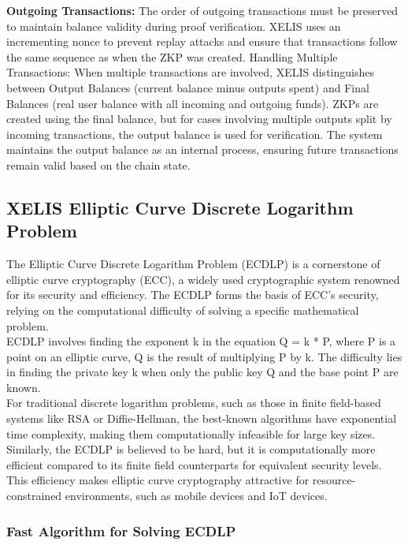 \documentclass[12pt,a4paper,twocolumn]{article}
\begin{document}
\textbf{Outgoing Transactions:} The order of outgoing transactions must be preserved to maintain balance validity during proof verification. XELIS uses an incrementing nonce to prevent replay attacks and ensure that transactions follow the same sequence as when the ZKP was created.
Handling Multiple Transactions: When multiple transactions are involved, XELIS distinguishes between Output Balances (current balance minus outputs spent) and Final Balances (real user balance with all incoming and outgoing funds). ZKPs are created using the final balance, but for cases involving multiple outputs split by incoming transactions, the output balance is used for verification. The system maintains the output balance as an internal process, ensuring future transactions remain valid based on the chain state.\\

\subsection{XELIS Elliptic Curve Discrete Logarithm Problem}

The Elliptic Curve Discrete Logarithm Problem (ECDLP) is a cornerstone of elliptic curve cryptography (ECC), a widely used cryptographic system renowned for its security and efficiency. The ECDLP forms the basis of ECC's security, relying on the computational difficulty of solving a specific mathematical problem.\\

ECDLP involves finding the exponent k in the equation Q = k * P, where P is a point on an elliptic curve, Q is the result of multiplying P by k. The difficulty lies in finding the private key k when only the public key Q and the base point P are known.\\

For traditional discrete logarithm problems, such as those in finite field-based systems like RSA or Diffie-Hellman, the best-known algorithms have exponential time complexity, making them computationally infeasible for large key sizes. Similarly, the ECDLP is believed to be hard, but it is computationally more efficient compared to its finite field counterparts for equivalent security levels. This efficiency makes elliptic curve cryptography attractive for resource-constrained environments, such as mobile devices and IoT devices.\\

\subsubsection{Fast Algorithm for Solving ECDLP}
\end{document}
